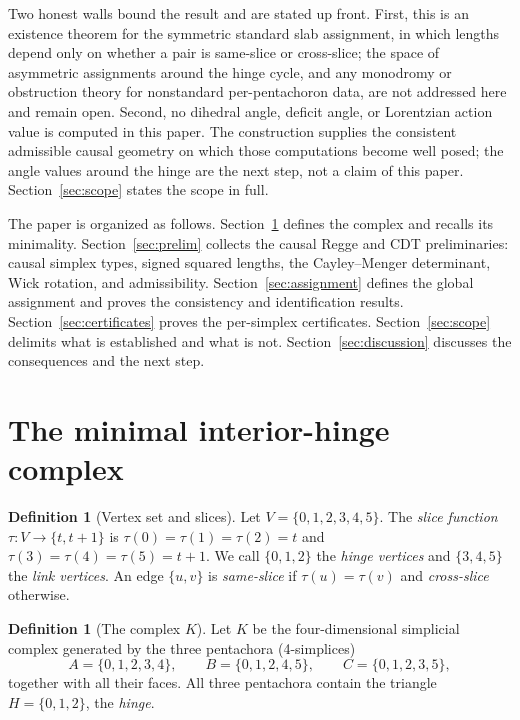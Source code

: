 \documentclass[11pt]{article}
\theoremstyle{definition}
\newtheorem{definition}[theorem]{Definition}
\theoremstyle{remark}
\newcommand{\Kmin}{K}
\begin{document}
Two honest walls bound the result and are stated up front. First, this is an existence theorem for the symmetric standard slab assignment, in which lengths depend only on whether a pair is same-slice or cross-slice; the space of asymmetric assignments around the hinge cycle, and any monodromy or obstruction theory for nonstandard per-pentachoron data, are not addressed here and remain open. Second, no dihedral angle, deficit angle, or Lorentzian action value is computed in this paper. The construction supplies the consistent admissible causal geometry on which those computations become well posed; the angle values around the hinge are the next step, not a claim of this paper. Section~\ref{sec:scope} states the scope in full.

The paper is organized as follows. Section~\ref{sec:complex} defines the complex and recalls its minimality. Section~\ref{sec:prelim} collects the causal Regge and CDT preliminaries: causal simplex types, signed squared lengths, the Cayley--Menger determinant, Wick rotation, and admissibility. Section~\ref{sec:assignment} defines the global assignment and proves the consistency and identification results. Section~\ref{sec:certificates} proves the per-simplex certificates. Section~\ref{sec:scope} delimits what is established and what is not. Section~\ref{sec:discussion} discusses the consequences and the next step.

\section{The minimal interior-hinge complex}
\label{sec:complex}

\begin{definition}[Vertex set and slices]
\label{def:vertices}
Let $V=\{0,1,2,3,4,5\}$. The \emph{slice function} $\tau\colon V\to\{t,t+1\}$ is $\tau(0)=\tau(1)=\tau(2)=t$ and $\tau(3)=\tau(4)=\tau(5)=t+1$. We call $\{0,1,2\}$ the \emph{hinge vertices} and $\{3,4,5\}$ the \emph{link vertices}. An edge $\{u,v\}$ is \emph{same-slice} if $\tau(u)=\tau(v)$ and \emph{cross-slice} otherwise.
\end{definition}

\begin{definition}[The complex $\Kmin$]
\label{def:complex}
Let $\Kmin$ be the four-dimensional simplicial complex generated by the three pentachora (4-simplices)
\[
A=\{0,1,2,3,4\},\qquad B=\{0,1,2,4,5\},\qquad C=\{0,1,2,3,5\},
\]
together with all their faces. All three pentachora contain the triangle $H=\{0,1,2\}$, the \emph{hinge}.
\end{definition}
\end{document}
